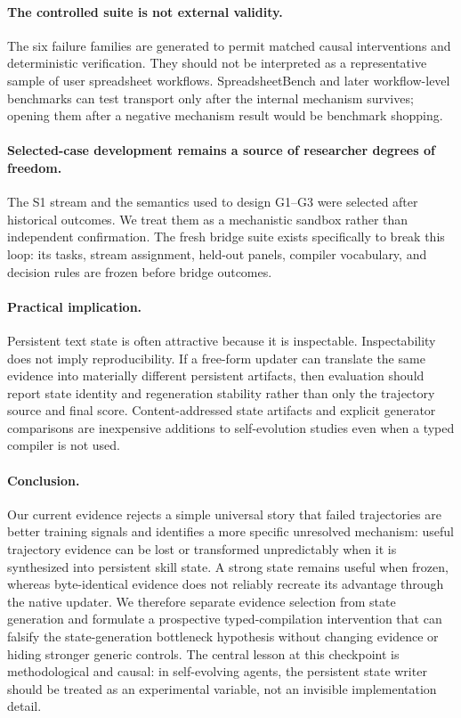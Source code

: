 \paragraph{The controlled suite is not external validity.}
The six failure families are generated to permit matched causal interventions and deterministic verification. They should not be interpreted as a representative sample of user spreadsheet workflows. SpreadsheetBench and later workflow-level benchmarks can test transport only after the internal mechanism survives; opening them after a negative mechanism result would be benchmark shopping.

\paragraph{Selected-case development remains a source of researcher degrees of freedom.}
The S1 stream and the semantics used to design G1--G3 were selected after historical outcomes. We treat them as a mechanistic sandbox rather than independent confirmation. The fresh bridge suite exists specifically to break this loop: its tasks, stream assignment, held-out panels, compiler vocabulary, and decision rules are frozen before bridge outcomes.

\paragraph{Practical implication.}
Persistent text state is often attractive because it is inspectable. Inspectability does not imply reproducibility. If a free-form updater can translate the same evidence into materially different persistent artifacts, then evaluation should report state identity and regeneration stability rather than only the trajectory source and final score. Content-addressed state artifacts and explicit generator comparisons are inexpensive additions to self-evolution studies even when a typed compiler is not used.

\paragraph{Conclusion.}
Our current evidence rejects a simple universal story that failed trajectories are better training signals and identifies a more specific unresolved mechanism: useful trajectory evidence can be lost or transformed unpredictably when it is synthesized into persistent skill state. A strong state remains useful when frozen, whereas byte-identical evidence does not reliably recreate its advantage through the native updater. We therefore separate evidence selection from state generation and formulate a prospective typed-compilation intervention that can falsify the state-generation bottleneck hypothesis without changing evidence or hiding stronger generic controls. The central lesson at this checkpoint is methodological and causal: in self-evolving agents, the persistent state writer should be treated as an experimental variable, not an invisible implementation detail.

